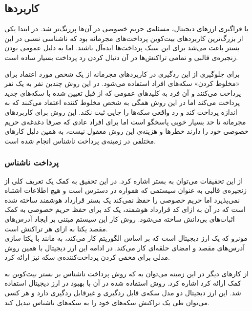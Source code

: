 \subsection{کاربرد‌ها}
با فراگیری ارز‌های دیجیتال، مسئله‌ی حریم خصوصی در آن‌ها پررنگ‌تر شد. در ابتدا یکی از بزرگ‌ترین کاربردهای بیت‌کوین پرداخت‌های مجرمانه بود که ناشناسی نسبی در این بستر باعث می‌شد برای این سبک‌ پرداخت‌ها ایده‌آل باشند. اما به دلیل عمومی بودن زنجیره‌ی قالبی و تمامی تراکنش‌ها در آن دنبال کردن رد پرداخت بسیار ساده است.
\par
 برای جلوگیری از این ردگیری در کاربردهای مجرمانه از یک شخص مورد اعتماد برای «مخلوط کردن» سکه‌های افراد استفاده می‌شود. در این روش چندین نفر به یک نفر پرداخت می‌کنند و آن فرد به کلید‌های عمومی که از قبل تعیین شده با سکه‌های جدید پرداخت می‌کند اما در این روش همگی به شخص مخلوط کننده اعتماد می‌کنند که به اندازه پرداخت کند و رد واقعی سکه‌ها را جایی ثبت نکند. این روش برای کاربردهای مجرمانه تا حد بسیار خوبی پاسخگو است اما برای افراد عادی که صرفا دغدغه‌ی حریم خصوصی خود را دارند خطرها و هزینه‌ي این روش معقول نیست، به همین دلیل کارهای مختلفی در زمینه‌ی پرداخت ناشناس انجام شده است. 
 
\subsubsection{پرداخت ناشناس}
از این تحقیقات می‌توان به بستر 
\cite{hawk}
اشاره کرد. در این تحقیق به کمک یک تعریف کلی از زنجیره‌ی قالبی به عنوان سیستمی که همواره در دسترس است و هیچ اطلاعات اشتباه نمی‌پذیرد اما حریم خصوصی را حفظ نمی‌کند یک بستر قرارداد هوشمند ساخته شده است که در آن به ازای کد قرارداد هوشمند، یک کد برای حفظ حریم خصوصی به کمک اثبات‌های بی‌دانش ساخته می‌شود. روش کار این سیستم مبتنی بر ایجاد آدرس‌های مقصد یکتا به ازای هر تراکنش است. 
\\
مونرو 
که یک ارز دیجیتال است که بر اساس الگوریتم 
\cite{monero}
کار می‌کند، به مانند 
با یکتا سازی آدرس‌های مقصد و امضای حلقه‌ای 
کار می‌کند. در ادامه این ارز دیجیتال با همین روش مدلی 
\cite{monero2}
برای مخفی کردن پرداخت‌کننده‌ی سکه نیز ارائه کرد.
\par
از کارهای دیگر در این زمینه‌ می‌توان به 
\cite{zerocoin}
که روش پرداخت ناشناس بر بستر بیت‌کوین به کمک 
ارائه کرد اشاره کرد. روش استفاده شده در آن با بهبود در ارز دیجیتال 
\cite{zerocash}
استفاده شد. این ارز دیجیتال دو مدل سکه‌ی قابل ردگیری و غیرقابل ردگیری دارد و هر کسی می‌توان طی یک تراکنش سکه‌های خود را به سکه‌های ناشناس تبدیل کند.

